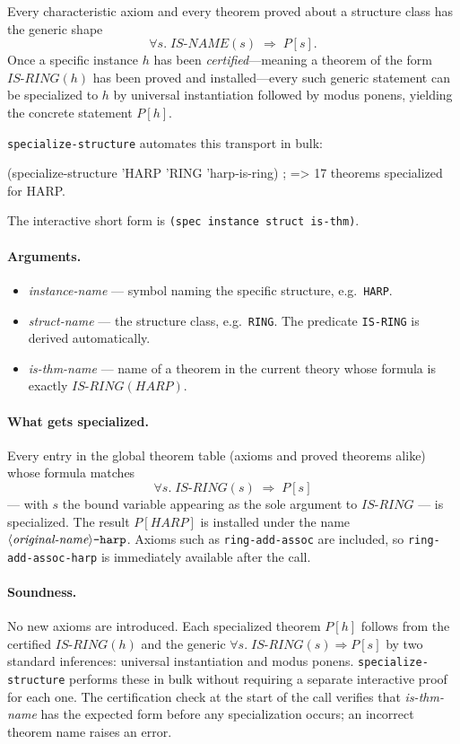 Every characteristic axiom and every theorem proved about a structure class
has the generic shape
\[
  \forall s.\;\mathit{IS\text{-}NAME}(s) \;\Rightarrow\; P[s].
\]
Once a specific instance $h$ has been \emph{certified}---meaning a theorem
of the form $\mathit{IS\text{-}RING}(h)$ has been proved and installed---every
such generic statement can be specialized to $h$ by universal instantiation
followed by modus ponens, yielding the concrete statement $P[h]$.

\texttt{specialize-structure} automates this transport in bulk:

\begin{VNBcode}
(specialize-structure 'HARP 'RING 'harp-is-ring)
; => 17 theorems specialized for HARP.
\end{VNBcode}

The interactive short form is \texttt{(spec instance struct is-thm)}.

\paragraph{Arguments.}
\begin{itemize}
\item \textit{instance-name} --- symbol naming the specific structure, e.g.\
  \texttt{HARP}.
\item \textit{struct-name} --- the structure class, e.g.\ \texttt{RING}.
  The predicate \texttt{IS-RING} is derived automatically.
\item \textit{is-thm-name} --- name of a theorem in the current theory
  whose formula is exactly $\mathit{IS\text{-}RING}(\mathit{HARP})$.
\end{itemize}

\paragraph{What gets specialized.}
Every entry in the global theorem table (axioms and proved theorems alike)
whose formula matches
\[
  \forall s.\;\mathit{IS\text{-}RING}(s) \;\Rightarrow\; P[s]
\]
--- with $s$ the bound variable appearing as the sole argument to
$\mathit{IS\text{-}RING}$ --- is specialized.  The result $P[\mathit{HARP}]$
is installed under the name
$\langle\textit{original\text{-}name}\rangle\texttt{-harp}$.
Axioms such as \texttt{ring-add-assoc} are included, so
\texttt{ring-add-assoc-harp} is immediately available after the call.

\paragraph{Soundness.}
No new axioms are introduced.  Each specialized theorem $P[h]$ follows
from the certified $\mathit{IS\text{-}RING}(h)$ and the generic
$\forall s.\;\mathit{IS\text{-}RING}(s)\Rightarrow P[s]$ by two standard
inferences: universal instantiation and modus ponens.
\texttt{specialize-structure} performs these in bulk without requiring a
separate interactive proof for each one.  The certification check at the
start of the call verifies that \textit{is-thm-name} has the expected form
before any specialization occurs; an incorrect theorem name raises an error.


